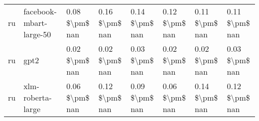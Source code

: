 \begin{tabular}{llllllll}
      ru &            facebook-mbart-large-50 & 0.08 \$\textbackslash pm\$ nan &            0.16 \$\textbackslash pm\$ nan &        0.14 \$\textbackslash pm\$ nan &         0.12 \$\textbackslash pm\$ nan &                          0.11 \$\textbackslash pm\$ nan &     0.11 \$\textbackslash pm\$ nan \\
      ru &                               gpt2 & 0.02 \$\textbackslash pm\$ nan &            0.02 \$\textbackslash pm\$ nan &        0.03 \$\textbackslash pm\$ nan &         0.02 \$\textbackslash pm\$ nan &                          0.02 \$\textbackslash pm\$ nan &     0.03 \$\textbackslash pm\$ nan \\
      ru &                  xlm-roberta-large & 0.06 \$\textbackslash pm\$ nan &            0.12 \$\textbackslash pm\$ nan &        0.09 \$\textbackslash pm\$ nan &         0.06 \$\textbackslash pm\$ nan &                          0.14 \$\textbackslash pm\$ nan &     0.12 \$\textbackslash pm\$ nan \\
\bottomrule
\end{tabular}
